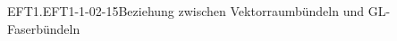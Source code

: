 \begin{REM}{EFT1.EFT1-1-02-15}{Beziehung zwischen Vektorraumbündeln und GL-Faserbündeln}

\end{REM}
